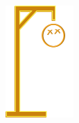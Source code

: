 \begin{figure}[ht]
\begin{subfigure}[b]{0.1\textwidth}
        \includegraphics[width=\textwidth]{./img/gui/hang1.png}
    \end{subfigure}
    \begin{subfigure}[b]{0.1\textwidth}

\end{subfigure}
\end{figure}
